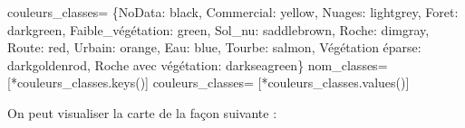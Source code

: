 \documentclass[
  french,
  11pt,
  letterpaper,
  open=any,
  twoside=false,
  french]{scrbook}
\newenvironment{Shaded}{\begin{snugshade}}{\end{snugshade}}
\newcommand{\NormalTok}[1]{\textcolor[rgb]{0.00,0.23,0.31}{#1}}
\newcommand{\OperatorTok}[1]{\textcolor[rgb]{0.37,0.37,0.37}{#1}}
\newcommand{\StringTok}[1]{\textcolor[rgb]{0.13,0.47,0.30}{#1}}
\begin{document}
\begin{Shaded}
\begin{Highlighting}[]
\NormalTok{couleurs\_classes}\OperatorTok{=}\NormalTok{ \{}\StringTok{\textquotesingle{}NoData\textquotesingle{}}\NormalTok{: }\StringTok{\textquotesingle{}black\textquotesingle{}}\NormalTok{, }\StringTok{\textquotesingle{}Commercial\textquotesingle{}}\NormalTok{: }\StringTok{\textquotesingle{}yellow\textquotesingle{}}\NormalTok{, }\StringTok{\textquotesingle{}Nuages\textquotesingle{}}\NormalTok{: }\StringTok{\textquotesingle{}lightgrey\textquotesingle{}}\NormalTok{, }
                    \StringTok{\textquotesingle{}Foret\textquotesingle{}}\NormalTok{: }\StringTok{\textquotesingle{}darkgreen\textquotesingle{}}\NormalTok{, }\StringTok{\textquotesingle{}Faible\_végétation\textquotesingle{}}\NormalTok{: }\StringTok{\textquotesingle{}green\textquotesingle{}}\NormalTok{, }\StringTok{\textquotesingle{}Sol\_nu\textquotesingle{}}\NormalTok{: }\StringTok{\textquotesingle{}saddlebrown\textquotesingle{}}\NormalTok{,}
                  \StringTok{\textquotesingle{}Roche\textquotesingle{}}\NormalTok{: }\StringTok{\textquotesingle{}dimgray\textquotesingle{}}\NormalTok{, }\StringTok{\textquotesingle{}Route\textquotesingle{}}\NormalTok{: }\StringTok{\textquotesingle{}red\textquotesingle{}}\NormalTok{, }\StringTok{\textquotesingle{}Urbain\textquotesingle{}}\NormalTok{: }\StringTok{\textquotesingle{}orange\textquotesingle{}}\NormalTok{, }\StringTok{\textquotesingle{}Eau\textquotesingle{}}\NormalTok{: }\StringTok{\textquotesingle{}blue\textquotesingle{}}\NormalTok{, }\StringTok{\textquotesingle{}Tourbe\textquotesingle{}}\NormalTok{: }\StringTok{\textquotesingle{}salmon\textquotesingle{}}\NormalTok{, }\StringTok{\textquotesingle{}Végétation éparse\textquotesingle{}}\NormalTok{: }\StringTok{\textquotesingle{}darkgoldenrod\textquotesingle{}}\NormalTok{, }\StringTok{\textquotesingle{}Roche avec végétation\textquotesingle{}}\NormalTok{: }\StringTok{\textquotesingle{}darkseagreen\textquotesingle{}}\NormalTok{\}}
\NormalTok{nom\_classes}\OperatorTok{=}\NormalTok{ [}\OperatorTok{*}\NormalTok{couleurs\_classes.keys()]}
\NormalTok{couleurs\_classes}\OperatorTok{=}\NormalTok{ [}\OperatorTok{*}\NormalTok{couleurs\_classes.values()]}
\end{Highlighting}
\end{Shaded}

On peut visualiser la carte de la façon suivante :
\end{document}
